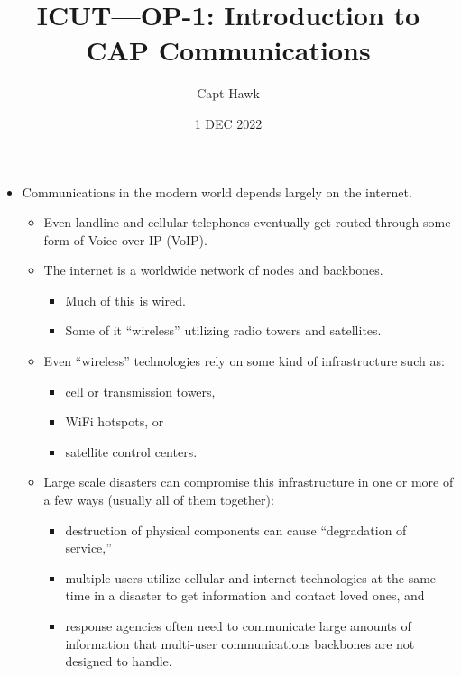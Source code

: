 \documentclass[talking]{usafpaper}
\title{ICUT---OP-1: Introduction to CAP Communications}
\author{Capt Hawk}
\date{1 DEC 2022}
\begin{document}
\maketitle

\begin{itemize}
    \item Communications in the modern world depends largely on the internet.
    \begin{itemize}
        \item Even landline and cellular telephones eventually get routed
        through some form of Voice over IP (VoIP).

        \item The internet is a worldwide network of nodes and backbones.
        \begin{itemize}
            \item Much of this is wired.
            \item Some of it ``wireless'' utilizing radio towers and
            satellites.
        \end{itemize}

        \item Even ``wireless'' technologies rely on some kind of
        infrastructure such as:
        \begin{itemize}
            \item cell or transmission towers, 
            \item WiFi hotspots, or
            \item satellite control centers.
        \end{itemize}

        \item Large scale disasters can compromise this infrastructure in one
        or more of a few ways (usually all of them together):
        \begin{itemize}
            \item destruction of physical components can cause ``degradation of
            service,''
            \item multiple users utilize cellular and internet technologies at
            the same time in a disaster to get information and contact loved
            ones, and
            \item response agencies often need to communicate large amounts of
            information that multi-user communications backbones are not
            designed to handle.
        \end{itemize}
    \end{itemize}


\end{itemize}
\end{document}
